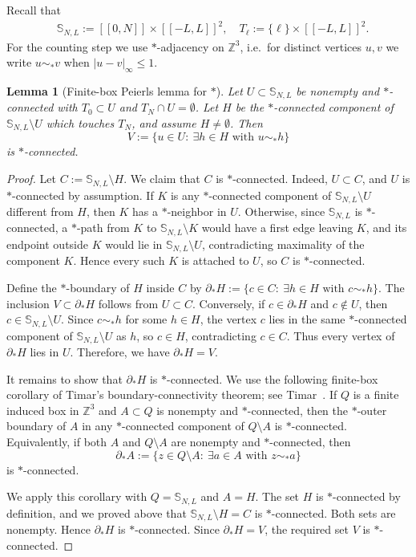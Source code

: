 \documentclass[11pt]{amsart}
\newtheorem{lemma}[theorem]{Lemma}
\theoremstyle{definition}
\numberwithin{equation}{section}
\newcommand{\Zbb}{\mathbb{Z}}
\newcommand{\Sbb}{\mathbb{S}}
\newcommand{\1}{\mathbbm{1}}
\begin{document}
Recall that
\begin{align*}
&    \Sbb_{N,L}:=[\![0,N]\!]\times[\![-L,L]\!]^2,\quad T_\ell := \{\ell\}\times [\![-L,L]\!]^2.
\end{align*}
For the counting step we use $*$-adjacency on $\Zbb^3$, i.e.\ for distinct
vertices $u,v$ we write $u\sim_* v$ when $|u-v|_\infty\le 1$.
\begin{lemma}[Finite-box Peierls lemma for $*$]\label{lem:finite-box-peierls}
Let $U\subset \Sbb_{N,L}$ be nonempty and $*$-connected with
$T_0\subset U$ and $T_N\cap U=\emptyset$. Let $H$ be the $*$-connected component of
$\Sbb_{N,L}\setminus U$ which touches
$T_N$, and assume $H\ne\emptyset$. Then
\[
V:=\{u\in U:\ \exists h\in H\text{ with }u\sim_* h\}
\]
is $*$-connected.
\end{lemma}

\begin{proof}
Let $C:=\Sbb_{N,L}\setminus H$. We claim that $C$ is $*$-connected. Indeed,
$U\subset C$, and $U$ is $*$-connected by assumption. If $K$ is any
$*$-connected component of $\Sbb_{N,L}\setminus U$ different from $H$, then
$K$ has a $*$-neighbor in $U$. Otherwise, since $\Sbb_{N,L}$ is
$*$-connected, a $*$-path from $K$ to $\Sbb_{N,L}\setminus K$ would have a first edge leaving
$K$, and its endpoint outside $K$ would lie in $\Sbb_{N,L}\setminus U$,
contradicting maximality of the component $K$. Hence every such $K$ is
attached to $U$, so $C$ is $*$-connected.

Define the $*$-boundary of $H$ inside $C$ by
$\partial_* H:=\{c\in C:\ \exists h\in H\text{ with }c\sim_* h\}$. The inclusion $V\subset \partial_* H$ follows from
$U\subset C$. Conversely, if $c\in\partial_* H$ and $c\notin U$, then
$c\in \Sbb_{N,L}\setminus U$. Since $c\sim_* h$ for some $h\in H$, the vertex
$c$ lies in the same $*$-connected component of $\Sbb_{N,L}\setminus U$ as
$h$, so $c\in H$, contradicting $c\in C$. Thus every vertex of
$\partial_* H$ lies in $U$. Therefore, we have
$\partial_* H=V$.

It remains to show that $\partial_* H$ is $*$-connected. We use the following
finite-box corollary of Timar's boundary-connectivity theorem; see
Timar~\cite[Theorem~3]{Timar2013BoundaryConnectivity}. If $Q$ is a finite
induced box in $\Zbb^3$ and $A\subset Q$ is nonempty and $*$-connected, then
the $*$-outer boundary of $A$ in any $*$-connected component of $Q\setminus A$
is $*$-connected. Equivalently, if both $A$ and $Q\setminus A$ are nonempty
and $*$-connected, then
\[
\partial_* A
:=\{z\in Q\setminus A:\ \exists a\in A\text{ with }z\sim_* a\}
\]
is $*$-connected.

We apply this corollary with $Q=\Sbb_{N,L}$ and $A=H$. The set $H$ is
$*$-connected by definition, and we proved above that
$\Sbb_{N,L}\setminus H=C$ is $*$-connected. Both sets are nonempty. Hence
$\partial_* H$ is $*$-connected. Since $\partial_* H=V$, the required set $V$
is $*$-connected.
\end{proof}
\end{document}
